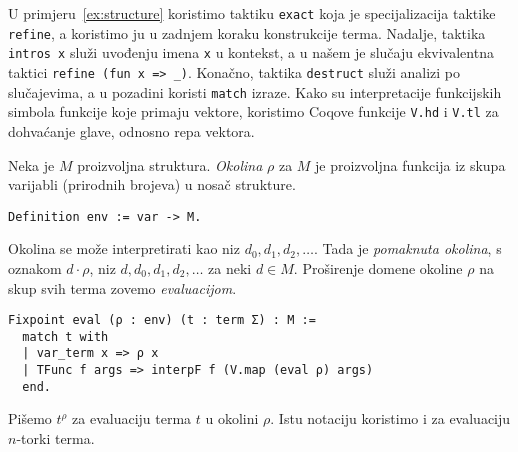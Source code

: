 \begin{remark}
  U primjeru~\ref{ex:structure} koristimo taktiku \texttt{exact} koja je specijalizacija taktike \texttt{refine},
  a koristimo ju u zadnjem koraku konstrukcije terma.
  Nadalje, taktika \texttt{intros x} služi uvođenju imena \texttt{x} u kontekst,
  a u našem je slučaju ekvivalentna taktici \texttt{refine (fun x => \_)}.
  Konačno, taktika \texttt{destruct} služi analizi po slučajevima, a u pozadini koristi \texttt{match} izraze.
  Kako su interpretacije funkcijskih simbola funkcije koje primaju vektore,
  koristimo Coqove funkcije \texttt{V.hd} i \texttt{V.tl} za dohvaćanje glave, odnosno repa vektora.
\end{remark}


\begin{definition}
  Neka je \(M\) proizvoljna struktura. \textit{Okolina} \(\rho\) za \(M\) je proizvoljna funkcija iz skupa varijabli (prirodnih brojeva) u nosač strukture.
\begin{verbatim}
Definition env := var -> M.
\end{verbatim}
  \noindent Okolina se može interpretirati kao niz \(d_{0}, d_{1}, d_{2}, \ldots\). Tada je \textit{pomaknuta okolina}, s oznakom \(d \cdot \rho\),
  niz \(d, d_{0}, d_{1}, d_{2}, \ldots\) za neki \(d \in M\).
  \noindent Proširenje domene okoline \(\rho\) na skup svih terma zovemo \textit{evaluacijom}.
\begin{verbatim}
Fixpoint eval (ρ : env) (t : term Σ) : M :=
  match t with
  | var_term x => ρ x
  | TFunc f args => interpF f (V.map (eval ρ) args)
  end.
\end{verbatim}
  Pišemo \(t^{\rho}\) za evaluaciju terma \(t\) u okolini \(\rho\).
  Istu notaciju koristimo i za evaluaciju \(n\)-torki terma.
\end{definition}

